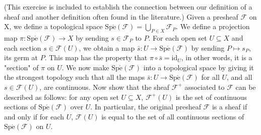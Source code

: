 \begin{exe}
	\label{2.1.13}
	(This exercise is included to establish the connection between our definition of a sheaf and another definition often found in the literature.) Given a presheaf $\mathscr{F}$ on X, we define a topological space $\mathrm{Sp\acute{e}}(\mathscr{F})=\bigcup_{P \in X}\mathscr{F}_P$. We define a projection map $\pi:\mathrm{Sp\acute{e}}(\mathscr{F})\to X$ by sending $s\in\mathscr{F}_P$ to $P$. For each open set $U\subseteq X$ and each section $s\in\mathscr{F}(U)$, we obtain a map $\bar{s}:U\to\mathrm{Sp\acute{e}}(\mathscr{F})$ by sending $P\mapsto s_P$, its germ at $P$. This map has the property that $\pi\circ\bar{s}=\mathrm{id}_U$, in other words, it is a "section" of $\pi$ on $U$. We now make $\mathrm{Sp\acute{e}}(\mathscr{F})$ into a topological space by giving it the strongest topology such that all the maps $\bar{s}:U\to\mathrm{Sp\acute{e}}(\mathscr{F})$ for all $U$, and all $s\in\mathscr{F}(U)$, are continuous. Now show that the sheaf $\mathscr{F}^+$ associated to $\mathscr{F}$ can be described as follows: for any open set $U\subseteq X$, $\mathscr{F}^+(U)$ is the set of continuous sections of $\mathrm{Sp\acute{e}}(\mathscr{F})$ over $U$. In particular, the original presheaf $\mathscr{F}$ is a sheaf if and only if for each $U$, $\mathscr{F}(U)$ is equal to the set of all continuous sections of $\mathrm{Sp\acute{e}}(\mathscr{F})$ on $U$.
\end{exe}

